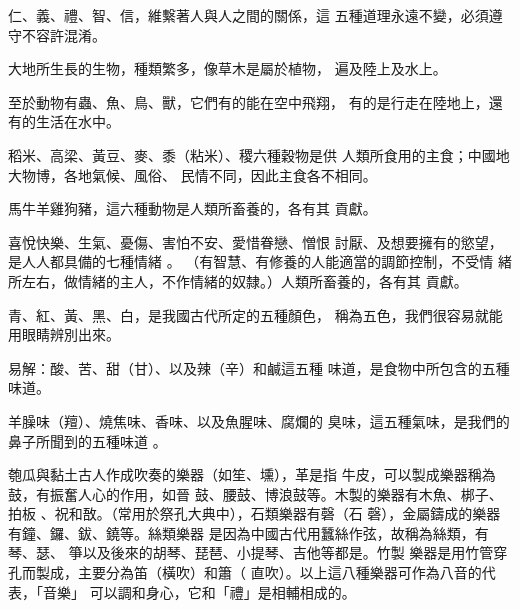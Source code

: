 \documentclass[avery5371,grid]{flashcards}
\begin{document}
{仁、義、禮、智、信，維繫著人與人之間的關係，這
五種道理永遠不變，必須遵守不容許混淆。} %
{} %

{大地所生長的生物，種類繁多，像草木是屬於植物，
遍及陸上及水上。} %
{} %

{至於動物有蟲、魚、鳥、獸，它們有的能在空中飛翔，
有的是行走在陸地上，還有的生活在水中。} %
{} %

{稻米、高梁、黃豆、麥、黍（粘米）、稷六種穀物是供
人類所食用的主食；中國地大物博，各地氣候、風俗、
民情不同，因此主食各不相同。} %
{} %

{馬牛羊雞狗豬，這六種動物是人類所畜養的，各有其
貢獻。} %
{} %

{喜悅快樂、生氣、憂傷、害怕不安、愛惜眷戀、憎恨
討厭、及想要擁有的慾望，是人人都具備的七種情緒
。} %
{（有智慧、有修養的人能適當的調節控制，不受情
緒所左右，做情緒的主人，不作情緒的奴隸。）人類所畜養的，各有其
貢獻。} %





{青、紅、黃、黑、白，是我國古代所定的五種顏色，
稱為五色，我們很容易就能用眼睛辨別出來。} %
{} %

{易解：酸、苦、甜（甘）、以及辣（辛）和鹹這五種
味道，是食物中所包含的五種味道。} %
{} %

{羊臊味（羶）、燒焦味、香味、以及魚腥味、腐爛的
臭味，這五種氣味，是我們的鼻子所聞到的五種味道
。} %
{} %

{匏瓜與黏土古人作成吹奏的樂器（如笙、壎），革是指
牛皮，可以製成樂器稱為鼓，有振奮人心的作用，如晉
鼓、腰鼓、博浪鼓等。木製的樂器有木魚、梆子、拍板
、祝和敔。（常用於祭孔大典中），石類樂器有磬（石
磬），金屬鑄成的樂器有鐘、鑼、鈸、鐃等。絲類樂器
是因為中國古代用蠶絲作弦，故稱為絲類，有琴、瑟、
箏以及後來的胡琴、琵琶、小提琴、吉他等都是。竹製
樂器是用竹管穿孔而製成，主要分為笛（橫吹）和簫（
直吹）。以上這八種樂器可作為八音的代表，「音樂」
可以調和身心，它和「禮」是相輔相成的。} %
{} %
\end{document}
